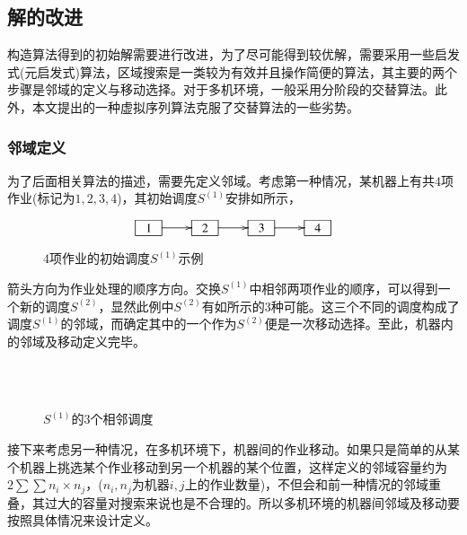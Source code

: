 \subsection{解的改进}
构造算法得到的初始解需要进行改进，为了尽可能得到较优解，需要采用一些启发式(元启发式)算法，区域搜索是一类较为有效并且操作简便的算法，其主要的两个步骤是邻域的定义与移动选择。对于多机环境，一般采用分阶段的交替算法。此外，本文提出的一种虚拟序列算法克服了交替算法的一些劣势。

\subsubsection{邻域定义}
为了后面相关算法的描述，需要先定义邻域。考虑第一种情况，某机器上有共$4$项作业(标记为$1,2,3,4$)，其初始调度$S^{(1)}$安排如所示，
\begin{figure}[h]
\begin{equation*}
\xymatrix{
\jobunit{1} \ar[r] & \jobunit{2} \ar[r] &\jobunit{3} \ar[r] &\jobunit{4}
}
\end{equation*}
\caption{$4$项作业的初始调度$S^{(1)}$示例\label{fig:4example}}
\end{figure}
箭头方向为作业处理的顺序方向。交换$S^{(1)}$中相邻两项作业的顺序，可以得到一个新的调度$S^{(2)}$，显然此例中$S^{(2)}$有如所示的$3$种可能。这三个不同的调度构成了调度$S^{(1)}$的邻域，而确定其中的一个作为$S^{(2)}$便是一次移动选择。至此，机器内的邻域及移动定义完毕。

\begin{figure}[h]
\centering
\vspace{1.5em}
\\
\\
\caption{$S^{(1)}$的$3$个相邻调度\label{fig:3neighbors}}
\end{figure}

接下来考虑另一种情况，在多机环境下，机器间的作业移动。如果只是简单的从某个机器上挑选某个作业移动到另一个机器的某个位置，这样定义的邻域容量约为$2\sum\sum n_i\times n_j$，($n_i,n_j$为机器$i,j$上的作业数量)，不但会和前一种情况的邻域重叠，其过大的容量对搜索来说也是不合理的。所以多机环境的机器间邻域及移动要按照具体情况来设计定义。

